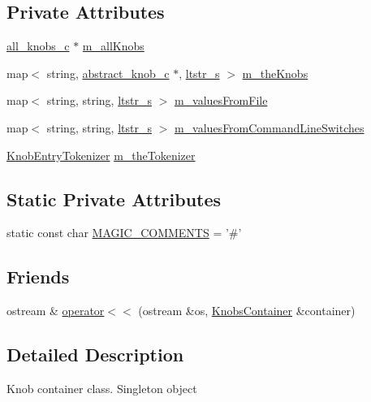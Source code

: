 \subsection*{Private Attributes}
\begin{DoxyCompactItemize}
\item 
\hyperlink{classall__knobs__c}{all\_\-knobs\_\-c} $\ast$ \hyperlink{classKnobsContainer_a91c5f9c036624bf76d18407e8deaf6df}{m\_\-allKnobs}
\item 
map$<$ string, \hyperlink{classabstract__knob__c}{abstract\_\-knob\_\-c} $\ast$, \hyperlink{structltstr__s}{ltstr\_\-s} $>$ \hyperlink{classKnobsContainer_aab767049ce233f64dc20d038a032555e}{m\_\-theKnobs}
\item 
map$<$ string, string, \hyperlink{structltstr__s}{ltstr\_\-s} $>$ \hyperlink{classKnobsContainer_aba4b723d1bc4ccbdde44c979a373fcf4}{m\_\-valuesFromFile}
\item 
map$<$ string, string, \hyperlink{structltstr__s}{ltstr\_\-s} $>$ \hyperlink{classKnobsContainer_acf9676b119cffbfdff8e7dfdd4d05f06}{m\_\-valuesFromCommandLineSwitches}
\item 
\hyperlink{classKnobEntryTokenizer}{KnobEntryTokenizer} \hyperlink{classKnobsContainer_add2e416036701c2de00e519c9552886d}{m\_\-theTokenizer}
\end{DoxyCompactItemize}
\subsection*{Static Private Attributes}
\begin{DoxyCompactItemize}
\item 
static const char \hyperlink{classKnobsContainer_a2bbc43ebe779aad064691c495016b11c}{MAGIC\_\-COMMENTS} = '\#'
\end{DoxyCompactItemize}
\subsection*{Friends}
\begin{DoxyCompactItemize}
\item 
ostream \& \hyperlink{classKnobsContainer_a7de0afdcad9e293a3ee2457167e484d3}{operator$<$$<$} (ostream \&os, \hyperlink{classKnobsContainer}{KnobsContainer} \&container)
\end{DoxyCompactItemize}


\subsection{Detailed Description}
Knob container class. Singleton object 

